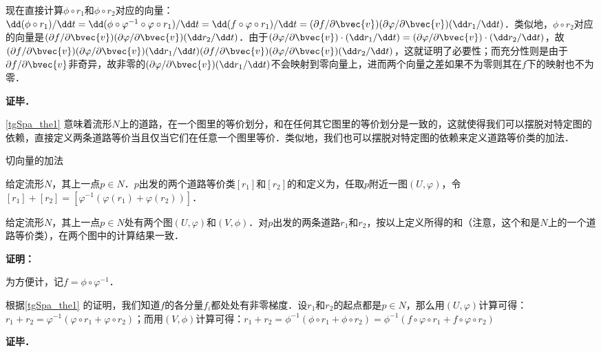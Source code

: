 现在直接计算$\phi\circ r_1$和$\phi\circ r_2$对应的向量：$\dd(\phi\circ r_1)/\dd t=\dd(\phi\circ\varphi^{-1}\circ\varphi\circ r_1)/\dd t=\dd(f\circ\varphi\circ r_1)/\dd t=(\partial f/\partial\bvec{v})(\partial\varphi/\partial\bvec{v})(\dd r_1/\dd t)$．类似地，$\phi\circ r_2$对应的向量是$(\partial f/\partial\bvec{v})(\partial\varphi/\partial\bvec{v})(\dd r_2/\dd t)$．由于$(\partial\varphi/\partial\bvec{v})\cdot(\dd r_1/\dd t)=(\partial\varphi/\partial\bvec{v})\cdot(\dd r_2/\dd t)$，故$(\partial f/\partial\bvec{v})(\partial\varphi/\partial\bvec{v})(\dd r_1/\dd t)(\partial f/\partial\bvec{v})(\partial\varphi/\partial\bvec{v})(\dd r_2/\dd t)$，这就证明了必要性；而充分性则是由于$\partial f/\partial\bvec{v}$非奇异，故非零的$(\partial\varphi/\partial\bvec{v})(\dd r_1/\dd t)$不会映射到零向量上，进而两个向量之差如果不为零则其在$f$下的映射也不为零．


\textbf{证毕．}

\autoref{tgSpa_the1} 意味着流形$N$上的道路，在一个图里的等价划分，和在任何其它图里的等价划分是一致的，这就使得我们可以摆脱对特定图的依赖，直接定义两条道路等价当且仅当它们在任意一个图里等价．类似地，我们也可以摆脱对特定图的依赖来定义道路等价类的加法．

\begin{definition}{切向量的加法}

给定流形$N$，其上一点$p\in N$．$p$出发的两个道路等价类$[r_1]$和$[r_2]$的和定义为，任取$p$附近一图$(U, \varphi)$，令$[r_1]+[r_2]=[\varphi^{-1}(\varphi(r_1)+\varphi(r_2))]$．

\end{definition}

\begin{theorem}{}
给定流形$N$，其上一点$p\in N$处有两个图$(U, \varphi)$和$(V, \phi)$．对$p$出发的两条道路$r_1$和$r_2$，按以上定义所得的和（注意，这个和是$N$上的一个道路等价类），在两个图中的计算结果一致．
\end{theorem}

\textbf{证明：}

为方便计，记$f=\phi\circ\varphi^{-1}$．

根据\autoref{tgSpa_the1} 的证明，我们知道$f$的各分量$f_i$都处处有非零梯度．设$r_1$和$r_2$的起点都是$p\in N$，那么用$(U, \varphi)$计算可得：$r_1+r_2=\varphi^{-1}(\varphi\circ r_1+\varphi\circ r_2)$；而用$(V, \phi)$计算可得：$r_1+r_2=\phi^{-1}(\phi\circ r_1+\phi\circ r_2)=\phi^{-1}(f\circ\varphi\circ r_1+f\circ\varphi\circ r_2)$

\textbf{证毕．}






